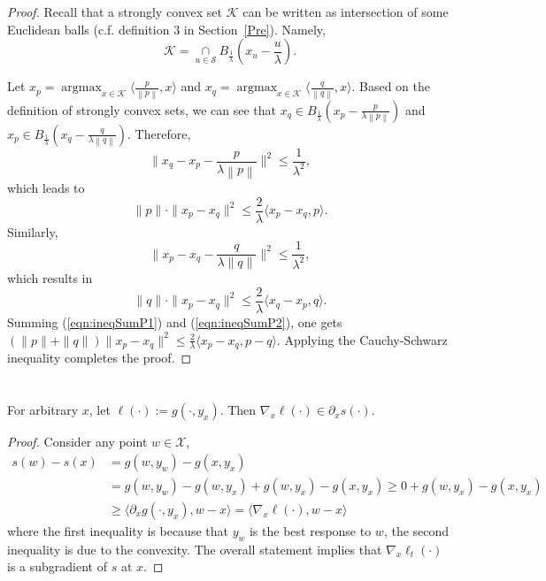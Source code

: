 \documentclass[pmlr]{jmlr} %
\def\K{\mathcal{K}}
\def\argmax{\mathop{\arg\max}}
\newcommand{\norm}[1]{\left\lVert#1\right\rVert}
\newcommand{\yx}[1]{y_{#1}}
\newcommand{\XX}{\mathcal{X}}
\begin{document}
\begin{proof}
Recall that a strongly convex set $\K$ can be written as intersection of some Euclidean balls (c.f. definition 3 in Section~\ref{Pre}).
Namely,
    \[ \K = \underset{u \in \mathcal{S}}{\cap} B_{\frac{1}{\lambda}} \left( x_{u} - \frac{u}{\lambda} \right) .\]

    Let  ${x_{p} = \argmax_{x \in \K} \langle \frac{p}{\norm{p}}, x\rangle }$ and ${x_{q} = \argmax_{x \in \K} \langle \frac{q}{\norm{q}}, x \rangle}$.
    Based on the definition of strongly convex sets, we can see that
    $x_{q} \in B_{ \frac{1}{\lambda}  } ( x_{p} - \frac{p}{\lambda \norm{p}})$ and $x_{p} \in B_{\frac{1}{\lambda}  } ( x_{q} - \frac{q}{\lambda \norm{q}} )$.
    Therefore, 
    \[
        \| x_{q} - x_{p} -  \frac{p}{\lambda \norm{p}} \|^{2} \leq \frac{1}{\lambda^{2}},
    \]
    which leads to
    \begin{equation}
        \label{eqn:ineqSumP1}
     \|p \| \cdot  \| x_{p} - x_{q} \|^{2} \leq \frac{2}{\lambda} \langle x_{p} - x_{q},  p \rangle.
    \end{equation}
    Similarly,
    \[
        \| x_{p} - x_{q} - \frac{q}{\lambda \|q\|} \|^{2} \leq \frac{1}{\lambda^{2}}, 
    \]
    which results in
    \begin{equation}
        \label{eqn:ineqSumP2}
      \| q \| \cdot  \| x_{p} - x_{q} \|^{2} \leq \frac{2}{\lambda} \langle x_{q} - x_{p},  q \rangle.
    \end{equation}
    Summing (\ref{eqn:ineqSumP1}) and (\ref{eqn:ineqSumP2}), one gets
    $(\|p\| + \| q \|) \| x_{p} - x_{q} \|^{2} \leq \frac{2}{\lambda} \langle x_{p} - x_{q}, p-q \rangle$.
    Applying the Cauchy-Schwarz inequality completes the proof.
\end{proof}

\section{} \label{app:smoothH-1}


\begin{proposition} \label{sameGrad}
For arbitrary $x$, let $\ell(\cdot) := g(\cdot, \yx{x})$. Then $\nabla_{x} \ell(\cdot) \in \partial_{x} s(\cdot)$.
\end{proposition}
\begin{proof}
Consider any point $w \in \XX$,
\begin{equation}
\begin{aligned}
 s(w) - s(x) & = g(w,\yx{w}) - g(x, \yx{x}) 
\\ &= g(w,\yx{w}) - g(w, \yx{x})  + g(w,\yx{x}) - g(x, \yx{x})
\geq 0 + g(w,\yx{x}) - g(x, \yx{x})
\\ & \geq  \langle \partial_{x} g( \cdot, \yx{x}) , w - x \rangle = \langle \nabla_{x} \ell(\cdot) , w - x \rangle
\end{aligned}
\end{equation}
where the first inequality is because that $\yx{w}$ is the best response to $w$, the second inequality is due to the convexity.
The overall statement implies that $\nabla_{x} \ell_{t}(\cdot)$ is a subgradient of $s$ at $x$.
\end{proof}
\end{document}
